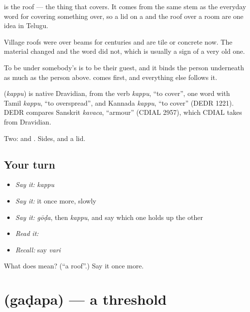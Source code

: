  is the roof — the thing that covers. It comes from the same stem as the everyday word for covering something over, so a lid on a  and the roof over a room are one idea in Telugu.

Village roofs were  over beams for centuries and are tile or concrete now. The material changed and the word did not, which is usually a sign of a very old one.

To be under somebody's  is to be their guest, and it binds the person underneath as much as the person above.  comes first, and everything else follows it.

\begin{cousinweb}
\textbf{} (\emph{kappu}) is native Dravidian, from the verb \emph{kappu}, \textquotedblleft{}to cover\textquotedblright{}, one word with Tamil \emph{kappu}, \textquotedblleft{}to overspread\textquotedblright{}, and Kannada \emph{kappu}, \textquotedblleft{}to cover\textquotedblright{} (DEDR 1221). DEDR compares Sanskrit \emph{kavaca}, \textquotedblleft{}armour\textquotedblright{} (CDIAL 2957), which CDIAL takes from Dravidian.
\end{cousinweb}

\begin{grammarlens}[title={What you've built}]
Two:  and . Sides, and a lid.
\end{grammarlens}

\subsection*{Your turn}
\begin{itemize}
\raggedright
  \item \emph{Say it:} \emph{kappu}
  \item \emph{Say it:} it once more, slowly
  \item \emph{Say it:} \emph{gōḍa}, then \emph{kappu}, and say which one holds up the other
  \item \emph{Read it:} \textbf{}
  \item \emph{Recall:} say \emph{vari}
\end{itemize}

\begin{tcolorbox}[breakable,colback=teal!4,colframe=teal!35!black,title={Before you move on}]
What does  mean? (\textquotedblleft{}a roof\textquotedblright{}.) Say it once more.
\end{tcolorbox}
\section[\texorpdfstring{\te{గడప} (gaḍapa)}{గడప (gaḍapa)}]{ (gaḍapa) — a threshold}

